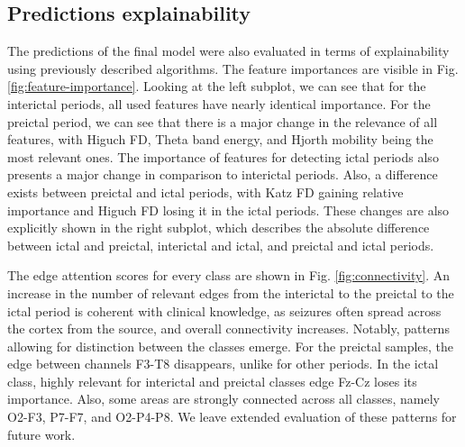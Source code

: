 \documentclass[a4paper,fleqn]{cas-sc}
\begin{document}
\subsection{Predictions explainability}
The predictions of the final model were also evaluated in terms of explainability using previously described algorithms. The feature importances are visible in Fig. \ref{fig:feature-importance}. Looking at the left subplot, we can see that for the interictal periods, all used features have nearly identical importance. For the preictal period, we can see that there is a major change in the relevance of all features, with Higuch FD, Theta band energy, and Hjorth mobility being the most relevant ones. The importance of features for detecting ictal periods also presents a major change in comparison to interictal periods. Also, a difference exists between preictal and ictal periods, with Katz FD gaining relative importance and Higuch FD losing it in the ictal periods. These changes are also explicitly shown in the right subplot, which describes the absolute difference between ictal and preictal, interictal and ictal, and preictal and ictal periods.

The edge attention scores for every class are shown in Fig. \ref{fig:connectivity}. An increase in the number of relevant edges from the interictal to the preictal to the ictal period is coherent with clinical knowledge, as seizures often spread across the cortex from the source, and overall connectivity increases. Notably, patterns allowing for distinction between the classes emerge. For the preictal samples, the edge between channels F3-T8 disappears, unlike for other periods. In the ictal class, highly relevant for interictal and preictal classes edge Fz-Cz loses its importance. Also, some areas are strongly connected across all classes, namely O2-F3, P7-F7, and O2-P4-P8. We leave extended evaluation of these patterns for future work.
\end{document}
